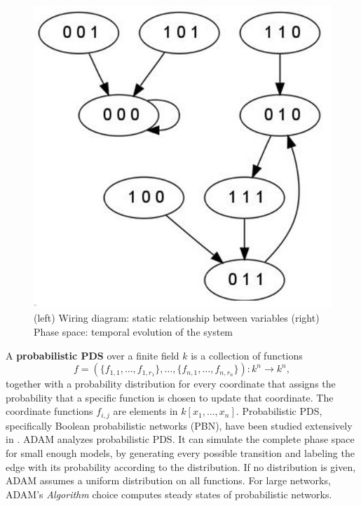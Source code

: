 \documentclass[10pt]{bmc_article}
\newenvironment{bmcformat}{\begin{raggedright}\baselineskip20pt\sloppy\setboolean{publ}{false}}{\end{raggedright}\baselineskip20pt\sloppy}
\begin{document}
\begin{bmcformat}
\begin{figure}[ht]
\includegraphics[scale=0.55]{exampleSS.jpg}
\caption{(left)
Wiring diagram: static relationship between variables
(right)
Phase space: temporal evolution of the system
}
\label{fig:ex}
\end{figure}


A {\bf probabilistic PDS} over a finite field $k$ is a collection of functions
$$f = (\{f_{1,1}, \ldots, f_{1, r_1}\}, \ldots, \{f_{n, 1}, \ldots, f_{n, r_n}
\}) : k^n \rightarrow k^n,$$
together with a probability distribution for every coordinate that assigns the
probability that a specific function is chosen to update that coordinate.
The coordinate functions $f_{i,j}$ are elements in $k[x_1, \ldots , x_n]$.
Probabilistic PDS, specifically Boolean probabilistic networks (PBN), have been studied
extensively in \cite{shmulevich}.
ADAM analyzes probabilistic PDS. It can simulate the
complete phase space for small enough models, by generating every possible
transition and labeling the edge with its probability according to the
distribution. If no distribution is given, ADAM assumes a uniform distribution
on all functions. For large networks, ADAM's {\it Algorithm} choice computes
steady states of probabilistic networks.

\end{bmcformat}
\end{document}
